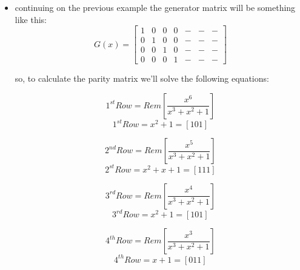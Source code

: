 \documentclass[a4paper,12pt]{report}
\begin{document}
{{{\begin{itemize}
        \begin{equation*}
            k^{th} Row = Rem \left[ \frac{x^{n-k}}{g(x)} \right]
        \end{equation*}

        \item continuing on the previous example the generator matrix will be something like this:
        \begin{equation*}
            G(x) = \left[ 
                \begin{matrix}
                1 & 0 & 0 & 0 & - & - & -\\
                0 & 1 & 0 & 0 & - & - & - \\
                0 & 0 & 1 & 0 & - & - & - \\
                0 & 0 & 0 & 1 & - & - & -                
                \end{matrix}
               \right]
        \end{equation*}

        so, to calculate the parity matrix we'll solve the following equations:

        \begin{equation*}
            1^{st} Row = Rem \left[ \frac{x^{6}}{ x^3 + x^2 +1} \right]
        \end{equation*}
        \begin{equation*}
            1^{st} Row = x^2 +1 = [1 0 1]
        \end{equation*}

        \begin{equation*}
            2^{nd} Row = Rem \left[ \frac{x^{5}}{ x^3 + x^2 +1} \right]
        \end{equation*}
        \begin{equation*}
            2^{st} Row = x^2 +x +1 = [1 1 1]
        \end{equation*}

        \begin{equation*}
            3^{rd} Row = Rem \left[ \frac{x^{4}}{ x^3 + x^2 +1} \right]
        \end{equation*}
        \begin{equation*}
            3^{rd} Row = x^2 +1 = [1 0 1]
        \end{equation*}

        \begin{equation*}
            4^{th} Row = Rem \left[ \frac{x^{3}}{ x^3 + x^2 +1} \right]
        \end{equation*}
        \begin{equation*}
            4^{th} Row = x +1 = [0 1 1]
        \end{equation*}


\end{itemize}}}}
\end{document}
